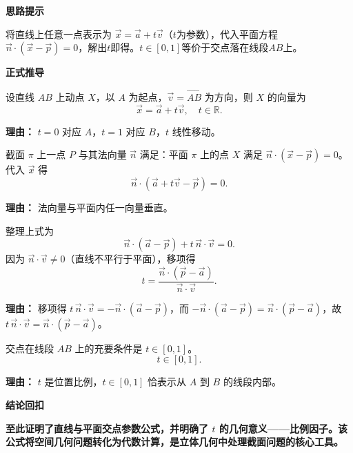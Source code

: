 \begin{proofbox}
	\textbf{\textcolor{CProof}{思路提示}}

	\medskip
	将直线上任意一点表示为 $\vec{x}=\vec{a}+t\vec{v}$（$t$为参数），代入平面方程 $\vec{n}\cdot(\vec{x}-\vec{p})=0$，解出$t$即得。$t\in[0,1]$等价于交点落在线段$AB$上。

	\medskip
	\textbf{\textcolor{CProof}{正式推导}}
	\begin{description}[style=nextline, leftmargin=2.8em, labelsep=0.5em, itemsep=0.55em]
		\item[\textbf{步骤一（参数设定）：}]
			设直线 $AB$ 上动点 $X$，以 $A$ 为起点，$\vec{v}=\overrightarrow{AB}$ 为方向，则 $X$ 的向量为
			\[
				\vec{x} = \vec{a} + t\vec{v},\quad t\in\mathbb{R}.
			\]
			\par\textbf{理由：} $t=0$ 对应 $A$，$t=1$ 对应 $B$，$t$ 线性移动。
		\item[\textbf{步骤二（代入平面方程）：}]
			截面 $\pi$ 上一点 $P$ 与其法向量 $\vec{n}$ 满足：平面 $\pi$ 上的点 $X$ 满足 $\vec{n}\cdot(\vec{x}-\vec{p})=0$。代入 $\vec{x}$ 得
			\[
				\vec{n}\cdot(\vec{a}+t\vec{v}-\vec{p}) = 0.
			\]
			\par\textbf{理由：} 法向量与平面内任一向量垂直。
		\item[\textbf{步骤三（求解参数 $t$）：}]
			整理上式为
			\[
				\vec{n}\cdot(\vec{a}-\vec{p}) + t\,\vec{n}\cdot\vec{v} = 0.
			\]
			因为 $\vec{n}\cdot\vec{v}\neq 0$（直线不平行于平面），移项得
			\[
				t = \frac{\vec{n}\cdot(\vec{p}-\vec{a})}{\vec{n}\cdot\vec{v}}.
			\]
			\par\textbf{理由：} 移项得 $t\,\vec{n}\cdot\vec{v} = -\vec{n}\cdot(\vec{a}-\vec{p})$，而 $-\vec{n}\cdot(\vec{a}-\vec{p}) = \vec{n}\cdot(\vec{p}-\vec{a})$，故 $t\,\vec{n}\cdot\vec{v} = \vec{n}\cdot(\vec{p}-\vec{a})$。
		\item[\textbf{步骤四（线段截取条件）：}]
			交点在线段 $AB$ 上的充要条件是 $t\in[0,1]$。
			\[
				t\in[0,1].
			\]
			\par\textbf{理由：} $t$ 是位置比例，$t\in[0,1]$ 恰表示从 $A$ 到 $B$ 的线段内部。
	\end{description}

	\medskip
	\textbf{\textcolor{CProof}{结论回扣}}

	\medskip
	\textbf{至此证明了直线与平面交点参数公式，并明确了 $t$ 的几何意义——比例因子。该公式将空间几何问题转化为代数计算，是立体几何中处理截面问题的核心工具。}
\end{proofbox}
